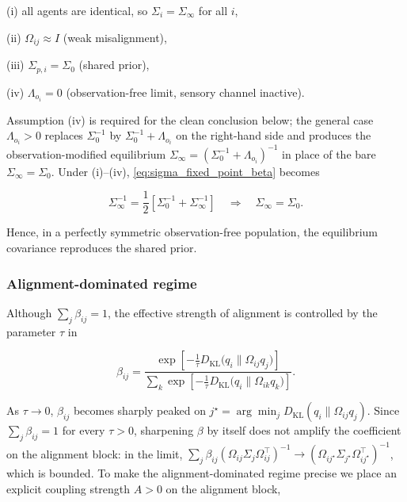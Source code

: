 \documentclass[11pt]{article}
\begin{document}
(i) all agents are identical, so $\Sigma_i = \Sigma_\infty$ for all $i$,

(ii) $\Omega_{ij} \approx I$ (weak misalignment),

(iii) $\Sigma_{p,i} = \Sigma_0$ (shared prior),

(iv) $\Lambda_{o_i} = 0$ (observation-free limit, sensory channel inactive).

Assumption (iv) is required for the clean conclusion below; the general case $\Lambda_{o_i} > 0$ replaces $\Sigma_0^{-1}$ by $\Sigma_0^{-1} + \Lambda_{o_i}$ on the right-hand side and produces the observation-modified equilibrium $\Sigma_\infty = (\Sigma_0^{-1} + \Lambda_{o_i})^{-1}$ in place of the bare $\Sigma_\infty = \Sigma_0$. Under (i)--(iv), \eqref{eq:sigma_fixed_point_beta} becomes

\begin{equation}
\Sigma_\infty^{-1}
=\frac{1}{2}
\left[
\Sigma_0^{-1}
+ \Sigma_\infty^{-1}
\right]
\quad\Longrightarrow\quad
\Sigma_\infty = \Sigma_0.
\end{equation}

Hence, in a perfectly symmetric observation-free population, the equilibrium covariance reproduces the shared prior.

\subsubsection{Alignment-dominated regime}

Although $\sum_j \beta_{ij} = 1$, the effective strength of alignment is controlled by the parameter $\tau$ in

\begin{equation}
\beta_{ij}
=\frac{
\exp\left[
-\frac{1}{\tau}
D_{\mathrm{KL}}\big(q_i \| \Omega_{ij} q_j\big)
\right]
}{\sum_k
\exp\left[
-\frac{1}{\tau}
D_{\mathrm{KL}}\big(q_i \| \Omega_{ik} q_k\big)
\right]}.
\end{equation}

As $\tau \to 0$, $\beta_{ij}$ becomes sharply peaked on $j^\star = \arg\min_j D_{\mathrm{KL}}(q_i \| \Omega_{ij}q_j)$. Since $\sum_j \beta_{ij} = 1$ for every $\tau > 0$, sharpening $\beta$ by itself does not amplify the coefficient on the alignment block: in the limit, $\sum_j \beta_{ij}(\Omega_{ij}\Sigma_j\Omega_{ij}^\top)^{-1} \to (\Omega_{ij^\star}\Sigma_{j^\star}\Omega_{ij^\star}^\top)^{-1}$, which is bounded. To make the alignment-dominated regime precise we place an explicit coupling strength $A > 0$ on the alignment block,
\end{document}
